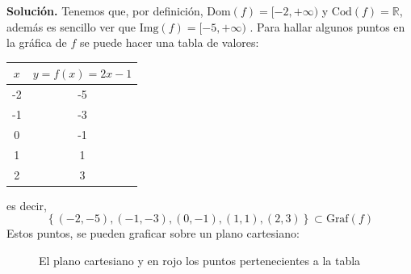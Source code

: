 {\textbf{Solución.}}  Tenemos que, por definici\'on,   $\text{Dom}(f)=  [-2,+\infty)$ y   $\text{Cod}(f)=  \mathbb{R}$, adem\'as es sencillo ver que $\text{Img}(f)= [-5,+\infty)$ .
  Para hallar algunos puntos en la gr\'afica de $f$ se puede hacer una tabla de valores:
    \begin{table}[H]
        \centering
        \begin{tabular}{|c|c|}
            \hline
            $x$ & $y=f(x)=2x-1$ \\ \hline
            -2  & -5        \\ \hline
            -1  & -3        \\ \hline
            0   & -1        \\ \hline
            1   & 1        \\ \hline
            2   & 3        \\ \hline
            \end{tabular}
      \end{table} es decir,
       \begin{equation*}
        \left\{(-2,-5), (-1,-3), (0,-1), (1,1),(2,3) \right\}\subset \text{Graf}(f)
    \end{equation*}  Estos puntos, se pueden graficar sobre un plano cartesiano:

\begin{figure}[H] 
       \begin{center}
             \end{center}
             \caption{El plano cartesiano y en rojo los puntos pertenecientes a la tabla}
        \label{fig:unitCircle1.2} 
   \end{figure}

